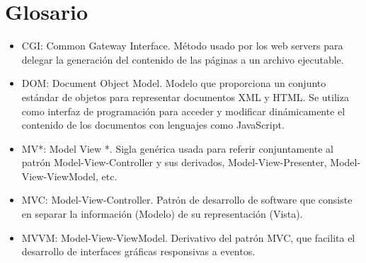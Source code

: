 \documentclass[doc,helv,longtable]{article}
\begin{document}
\newpage

\section*{Glosario}

\begin{itemize}
\item  CGI: Common Gateway Interface. Método usado por los web servers para delegar la generación del contenido de las páginas a un archivo ejecutable.
\item  DOM: Document Object Model. Modelo que proporciona un conjunto estándar de objetos para representar documentos XML y HTML. Se utiliza como interfaz de programación para acceder y modificar dinámicamente el contenido de los documentos con lenguajes como JavaScript.
\item  MV*: Model View *. Sigla genérica usada para referir conjuntamente al patrón Model-View-Controller y sus derivados, Model-View-Presenter, Model-View-ViewModel, etc.
\item  MVC: Model-View-Controller. Patrón de desarrollo de software que consiste en separar la información (Modelo) de su representación (Vista).
\item  MVVM: Model-View-ViewModel. Derivativo del patrón MVC, que facilita el desarrollo de interfaces gráficas responsivas a eventos.

\end{itemize}

\newpage
\end{document}
